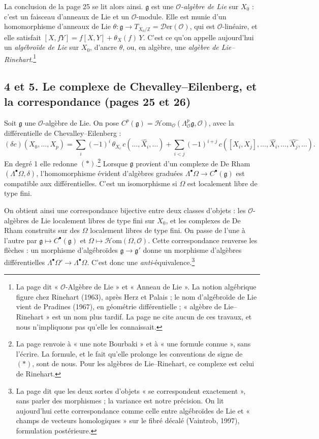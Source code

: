\documentclass[11pt,a4paper]{article}
\begin{document}
La conclusion de la page 25 se lit alors ainsi. $\mathfrak{g}$ est une
\emph{$\mathcal{O}$-algèbre de Lie} sur $X_0$ : c'est un faisceau d'anneaux de
Lie et un $\mathcal{O}$-module. Elle est munie d'un homomorphisme d'anneaux de
Lie $\theta : \mathfrak{g} \to T_{X_0/\mathbb{Z}} =
\mathcal{D}\mathrm{er}(\mathcal{O})$, qui est $\mathcal{O}$-linéaire, et elle
satisfait $[X, fY] = f[X,Y] + \theta_X(f)\,Y$. C'est ce qu'on appelle
aujourd'hui un \emph{algébroïde de Lie} sur $X_0$, d'ancre $\theta$, ou, en
algèbre, une \emph{algèbre de Lie--Rinehart}.\footnote{La page dit
« $\mathcal{O}$-Algèbre de Lie » et « Anneau de Lie ». La notion algébrique
figure chez Rinehart (1963), après Herz et Palais ; le nom d'algébroïde de Lie
vient de Pradines (1967), en géométrie différentielle ; « algèbre de
Lie--Rinehart » est un nom plus tardif. La page ne cite aucun de ces travaux, et
nous n'impliquons pas qu'elle les connaissait.}

\subsection*{4 et 5. Le complexe de Chevalley--Eilenberg, et la correspondance (pages 25 et 26)}

Soit $\mathfrak{g}$ une $\mathcal{O}$-algèbre de Lie. On pose
$C^{p}(\mathfrak{g}) =
\mathcal{H}\mathrm{om}_{\mathcal{O}}(\Lambda^{p}_{\mathcal{O}}\mathfrak{g},
\mathcal{O})$, avec la différentielle de Chevalley--Eilenberg :
\[
(\delta c)(X_0, \ldots, X_p) = \sum_{i} (-1)^{i}\,\theta_{X_i}\,c(\ldots, \widehat{X_i}, \ldots)
+ \sum_{i<j} (-1)^{i+j}\,c([X_i, X_j], \ldots, \widehat{X_i}, \ldots, \widehat{X_j}, \ldots).
\]
En degré 1 elle redonne $(*)$.\footnote{La page renvoie à « une note Bourbaki »
et à « une formule connue », sans l'écrire. La formule, et le fait qu'elle
prolonge les conventions de signe de $(*)$, sont de nous. Pour les algèbres de
Lie--Rinehart, ce complexe est celui de Rinehart.} Lorsque $\mathfrak{g}$
provient d'un complexe de De Rham $(\Lambda^{\bullet}\Omega, \delta)$,
l'homomorphisme évident d'algèbres graduées $\Lambda^{\bullet}\Omega \to
C^{\bullet}(\mathfrak{g})$ est compatible aux différentielles. C'est un
isomorphisme si $\Omega$ est localement libre de type fini.

On obtient ainsi une correspondance bijective entre deux classes d'objets : les
$\mathcal{O}$-algèbres de Lie localement libres de type fini sur $X_0$, et les
complexes de De Rham construits sur des $\Omega$ localement libres de type
fini. On passe de l'une à l'autre par $\mathfrak{g} \mapsto
C^{\bullet}(\mathfrak{g})$ et $\Omega \mapsto
\mathcal{H}\mathrm{om}(\Omega, \mathcal{O})$. Cette correspondance renverse
les flèches : un morphisme d'algébroïdes $\mathfrak{g} \to \mathfrak{g}'$
donne un morphisme d'algèbres différentielles $\Lambda^{\bullet}\Omega' \to
\Lambda^{\bullet}\Omega$. C'est donc une \emph{anti}-équivalence.\footnote{La
page dit que les deux sortes d'objets « se correspondent exactement », sans
parler des morphismes ; la variance est notre précision. On lit aujourd'hui
cette correspondance comme celle entre algébroïdes de Lie et « champs de
vecteurs homologiques » sur le fibré décalé (Vaintrob, 1997), formulation
postérieure.}
\end{document}
